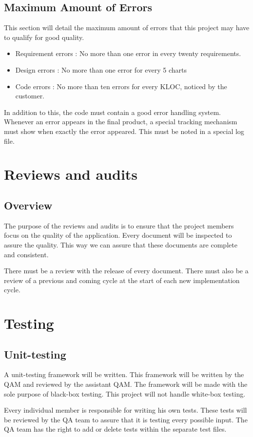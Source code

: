 \documentclass[salesmen, twoside]{../../../templates/latex/2009/softproj}
\begin{document}
\begin{projdoc}
\section{Maximum Amount of Errors}
This section will detail the maximum amount of errors that this project may have to qualify for good quality.
\begin{itemize}
\item Requirement errors : No more than one error in every twenty requirements.
\item Design errors : No more than one error for every 5 charts
\item Code errors : No more than ten errors for every KLOC, noticed by the customer.
\end{itemize}
In addition to this, the code must contain a good error handling system. Whenever an error appears in the final product, a special tracking mechanism must show when exactly the error appeared. This must be noted in a special log file.

\chapter{Reviews and audits}
\section{Overview}
The purpose of the reviews and audits is to ensure that the project members focus on the quality of the application. Every document will be inspected to assure the quality. This way we can assure that these documents are complete and consistent.

There must be a review with the release of every document. There must also be a review of a previous and coming cycle at the start of each new implementation cycle.

\chapter{Testing}
\section{Unit-testing}
A unit-testing framework will be written. This framework will be written by the QAM and reviewed by the assistant QAM. The framework will be made with the sole purpose of black-box testing. This project will not handle white-box testing.

Every individual member is responsible for writing his own tests. These tests will be reviewed by the QA team to assure that it is testing every possible input. The QA team has the right to add or delete tests within the separate test files.


\end{projdoc}
\end{document}
